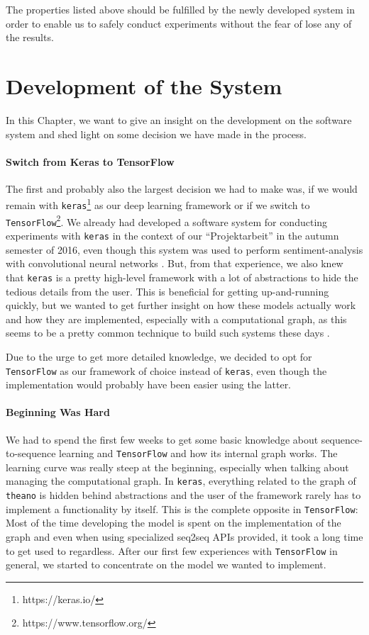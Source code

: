 The properties listed above should be fulfilled by the newly developed system in order to enable us to safely conduct experiments without the fear of lose any of the results.

\section{Development of the System}
\label{software_system:development_history}
In this Chapter, we want to give an insight on the development on the software system and shed light on some decision we have made in the process.

\paragraph{Switch from Keras to TensorFlow} The first and probably also the largest decision we had to make was, if we would remain with \texttt{keras}\footnote{https://keras.io/} as our deep learning framework or if we switch to \texttt{TensorFlow}\footnote{https://www.tensorflow.org/}. We already had developed a software system for conducting experiments with \texttt{keras} in the context of our ``Projektarbeit'' in the autumn semester of 2016, even though this system was used to perform sentiment-analysis with convolutional neural networks \cite{Vongruenigen:2017}. But, from that experience, we also knew that \texttt{keras} is a pretty high-level framework with a lot of abstractions to hide the tedious details from the user. This is beneficial for getting up-and-running quickly, but we wanted to get further insight on how these models actually work and how they are implemented, especially with a computational graph, as this seems to be a pretty common technique to build such systems these days \cite{TensorFlow:2015}\cite{Theano:2016}\cite{Torch:2011}.

Due to the urge to get more detailed knowledge, we decided to opt for \texttt{TensorFlow} as our framework of choice instead of \texttt{keras}, even though the implementation would probably have been easier using the latter.
\paragraph{Beginning Was Hard} We had to spend the first few weeks to get some basic knowledge about sequence-to-sequence learning and \texttt{TensorFlow} and how its internal graph works. The learning curve was really steep at the beginning, especially when talking about managing the computational graph. In \texttt{keras}, everything related to the graph of \texttt{theano} is hidden behind abstractions and the user of the framework rarely has to implement a functionality by itself. This is the complete opposite in \texttt{TensorFlow}: Most of the time developing the model is spent on the implementation of the graph and even when using specialized seq2seq APIs provided, it took a long time to get used to regardless. After our first few experiences with \texttt{TensorFlow} in general, we started to concentrate on the model we wanted to implement.

